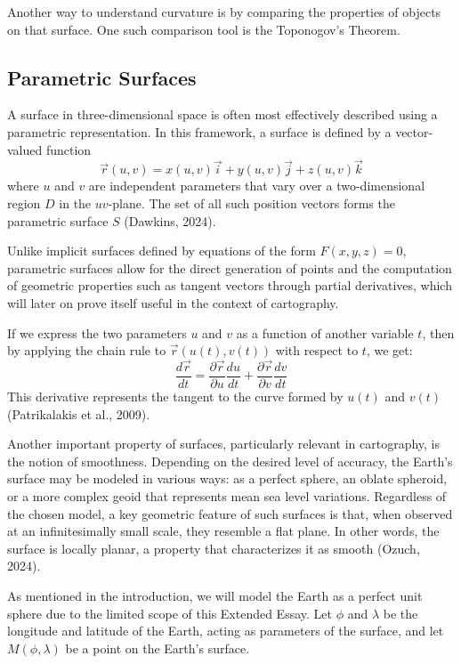 Another way to understand curvature is by comparing the properties of objects on that surface. One such comparison tool is
the Toponogov's Theorem.

\pagebreak
\subsection{Parametric Surfaces}
\vspace*{-10pt}
A surface in three-dimensional space is often most effectively 
described using a parametric representation. In this framework, a 
surface is defined by a vector-valued function
\begin{equation}
    \vec{r}(u,v)=x(u,v)\vec{i} + y(u,v)\vec{j} + z(u,v)\vec{k}
\end{equation}
where $u$ and $v$ are independent parameters that vary over a 
two-dimensional region $D$ in the $uv$-plane. The set of all such position 
vectors forms the parametric surface $S$ (Dawkins, 2024).

Unlike implicit surfaces defined by equations of the form $F(x,y,z)=0$, parametric
surfaces allow for the direct generation of points and the computation of geometric
properties such as tangent vectors through partial derivatives, which will later 
on prove itself useful in the context of cartography.

If we express the two parameters $u$ and $v$ as a function of another variable
$t$, then by applying the chain rule to $\vec{r}(u(t),v(t))$ with respect to 
$t$, we get:
\begin{equation}
    \frac{d\vec{r}}{dt}=\frac{\partial \vec{r}}{\partial u}\frac{du}{dt}+\frac{\partial \vec{r}}{\partial v}\frac{dv}{dt}
\end{equation}
This derivative represents the tangent to the curve formed by $u(t)$ and $v(t)$ 
(Patrikalakis et al., 2009).

Another important property of surfaces, particularly relevant in cartography, 
is the notion of smoothness. Depending on the desired level of accuracy, the 
Earth's surface may be modeled in various ways: as a perfect sphere, an oblate 
spheroid, or a more complex geoid that represents mean sea level variations. 
Regardless of the chosen model, a key geometric feature of such surfaces is 
that, when observed at an infinitesimally small scale, they resemble a flat 
plane. In other words, the surface is locally planar, a property that 
characterizes it as smooth (Ozuch, 2024).

As mentioned in the introduction, we will model the Earth as a perfect unit sphere
due to the limited scope of this Extended Essay. Let $\phi$ and $\lambda$ be
the longitude and latitude of the Earth, acting as parameters of the surface, 
and let $M(\phi,\lambda)$ be a point on the Earth's surface. 

